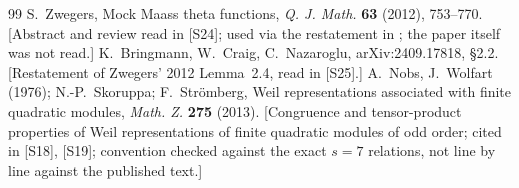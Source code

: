\documentclass[11pt]{article}
\theoremstyle{definition}
\theoremstyle{plain}
\newcommand{\src}[1]{\textup{[S#1]}}
\begin{document}
\begin{thebibliography}{99}
 S.~Zwegers, Mock Maass theta functions, \emph{Q. J. Math.} \textbf{63} (2012), 753--770. [Abstract and review read in \src{24}; used via the restatement in \cite{BCN}; the paper itself was not read.]
 K.~Bringmann, W.~Craig, C.~Nazaroglu, arXiv:2409.17818, \S2.2. [Restatement of Zwegers' 2012 Lemma~2.4, read in \src{25}.]
 A.~Nobs, J.~Wolfart (1976); N.-P.~Skoruppa; F.~Str\"omberg, Weil representations associated with finite quadratic modules, \emph{Math. Z.} \textbf{275} (2013). [Congruence and tensor-product properties of Weil representations of finite quadratic modules of odd order; cited in \src{18}, \src{19}; convention checked against the exact $s=7$ relations, not line by line against the published text.]
\end{thebibliography}
\end{document}

